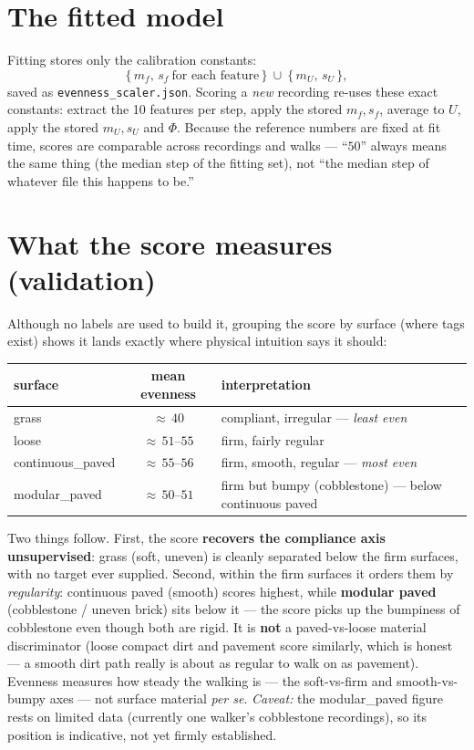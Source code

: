 \documentclass[11pt]{article}
\newcommand{\code}[1]{\texttt{#1}}
\begin{document}
\section{The fitted model}
Fitting stores only the calibration constants:
\[
\bigl\{\,m_f,\,s_f\ \text{for each feature}\,\bigr\}\ \cup\ \bigl\{\,m_U,\,s_U\,\bigr\},
\]
saved as \code{evenness_scaler.json}. Scoring a \emph{new} recording re-uses these exact constants:
extract the 10 features per step, apply the stored $m_f,s_f$, average to $U$, apply the stored
$m_U,s_U$ and $\Phi$. Because the reference numbers are fixed at fit time, scores are comparable
across recordings and walks --- ``$50$'' always means the same thing (the median step of the fitting
set), not ``the median step of whatever file this happens to be.''

\section{What the score measures (validation)}
Although no labels are used to build it, grouping the score by surface (where tags exist) shows it
lands exactly where physical intuition says it should:
\begin{center}
\begin{tabular}{@{}lcl@{}}
\toprule
surface & mean evenness & interpretation \\
\midrule
grass            & ${\approx}\,40$        & compliant, irregular --- \emph{least even} \\
loose            & ${\approx}\,51$--$55$  & firm, fairly regular \\
continuous\_paved & ${\approx}\,55$--$56$  & firm, smooth, regular --- \emph{most even} \\
modular\_paved    & ${\approx}\,50$--$51$  & firm but bumpy (cobblestone) --- below continuous paved \\
\bottomrule
\end{tabular}
\end{center}
Two things follow. First, the score \textbf{recovers the compliance axis unsupervised}: grass
(soft, uneven) is cleanly separated below the firm surfaces, with no target ever supplied. Second,
within the firm surfaces it orders them by \emph{regularity}: continuous paved (smooth) scores
highest, while \textbf{modular paved} (cobblestone / uneven brick) sits below it --- the score picks
up the bumpiness of cobblestone even though both are rigid. It is \textbf{not} a paved-vs-loose
material discriminator (loose compact dirt and pavement score similarly, which is honest --- a smooth
dirt path really is about as regular to walk on as pavement). Evenness measures how steady the
walking is --- the soft-vs-firm and smooth-vs-bumpy axes --- not surface material \emph{per se}.
\emph{Caveat:} the modular\_paved figure rests on limited data (currently one walker's cobblestone
recordings), so its position is indicative, not yet firmly established.
\end{document}
